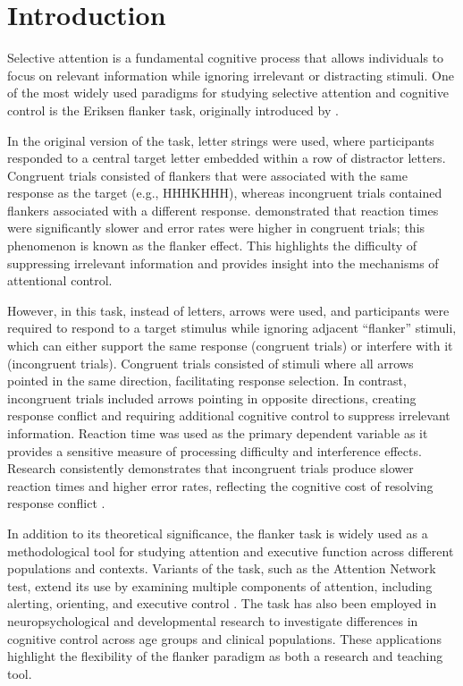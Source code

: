 \documentclass[
  authoryear,
  preprint]{elsarticle}
\begin{document}
\section{Introduction}\label{introduction}

Selective attention is a fundamental cognitive process that allows
individuals to focus on relevant information while ignoring irrelevant
or distracting stimuli. One of the most widely used paradigms for
studying selective attention and cognitive control is the Eriksen
flanker task, originally introduced by \citet{eriksen1974}.

In the original version of the task, letter strings were used, where
participants responded to a central target letter embedded within a row
of distractor letters. Congruent trials consisted of flankers that were
associated with the same response as the target (e.g., HHHKHHH), whereas
incongruent trials contained flankers associated with a different
response. \citet{eriksen1974} demonstrated that reaction times were
significantly slower and error rates were higher in congruent trials;
this phenomenon is known as the flanker effect. This highlights the
difficulty of suppressing irrelevant information and provides insight
into the mechanisms of attentional control.

However, in this task, instead of letters, arrows were used, and
participants were required to respond to a target stimulus while
ignoring adjacent ``flanker'' stimuli, which can either support the same
response (congruent trials) or interfere with it (incongruent trials).
Congruent trials consisted of stimuli where all arrows pointed in the
same direction, facilitating response selection. In contrast,
incongruent trials included arrows pointing in opposite directions,
creating response conflict and requiring additional cognitive control to
suppress irrelevant information. Reaction time was used as the primary
dependent variable as it provides a sensitive measure of processing
difficulty and interference effects. Research consistently demonstrates
that incongruent trials produce slower reaction times and higher error
rates, reflecting the cognitive cost of resolving response conflict
\citep{eriksen1974}.

In addition to its theoretical significance, the flanker task is widely
used as a methodological tool for studying attention and executive
function across different populations and contexts. Variants of the
task, such as the Attention Network test, extend its use by examining
multiple components of attention, including alerting, orienting, and
executive control \citep{fan2002}. The task has also been employed in
neuropsychological and developmental research to investigate differences
in cognitive control across age groups and clinical populations. These
applications highlight the flexibility of the flanker paradigm as both a
research and teaching tool.
\end{document}
